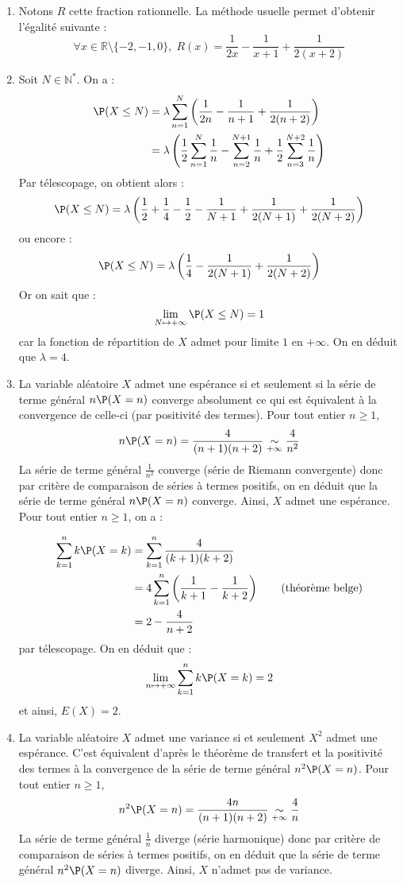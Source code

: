 \documentclass[a4paper,10pt]{report}
\begin{document}
\newpage

\corr \begin{enumerate}
\item Notons $R$ cette fraction rationnelle. La méthode usuelle permet d'obtenir l'égalité suivante :
$$ \forall x \in \mathbb{R} \setminus \lbrace -2,-1,0 \rbrace, \; R(x)= \dfrac{1}{2x}-\dfrac{1}{x+1}+\dfrac{1}{2(x+2)}$$
\item Soit $N\in \mathbb{N}^*$. On a :
\begin{align*}
\P(X\leq N) & =\lambda\displaystyle\sum\limits_{n=1}^{N}\left(\frac{1}{2n}-\frac{1}{n+1}+\frac{1}{2(n+2)}\right) \\
& =\lambda\left(  \dfrac{1}{2}\displaystyle\sum\limits_{n=1}^{N}\dfrac{1}{n}-\displaystyle\sum\limits_{n=2}^{N+1}\dfrac{1}{n}+\frac{1}{2}\displaystyle\sum\limits_{n=3}^{N+2}\dfrac{1}{n}\right) 
\end{align*}
Par télescopage, on obtient alors :
$$\P(X\leq N)=\lambda\left( \dfrac{1}{2}+\dfrac{1}{4}-\dfrac{1}{2}-\dfrac{1}{N+1}+\dfrac{1}{2(N+1)}+\dfrac{1}{2(N+2)}\right) $$ 
ou encore :
$$ \P(X\leq N)=\lambda\left( \dfrac{1}{4}-\dfrac{1}{2(N+1)}+\dfrac{1}{2(N+2)}\right) $$
Or on sait que :
$$\lim\limits_{N\mapsto+\infty} \P(X\leq N)=1$$
car la fonction de répartition de $X$ admet pour limite $1$ en $+ \infty$. On en déduit que $\lambda=4$.
\item La variable aléatoire $X$ admet une espérance si et seulement si la série de terme général $n \P(X=n)$ converge absolument ce qui est équivalent à la convergence de celle-ci (par positivité des termes). Pour tout entier $n \geq 1$,
$$ n \P(X=n) = \frac{4}{(n+1)(n+2)} \underset{+ \infty}{\sim} \dfrac{4}{n^2}$$
La série de terme général $\tfrac{1}{n^2}$ converge (série de Riemann convergente) donc par critère de comparaison de séries à termes positifs, on en déduit que la série de terme général $n \P(X=n)$ converge. Ainsi, $X$ admet une espérance. Pour tout entier $n \geq 1$, on a :

\begin{align*}
\displaystyle\sum\limits_{k=1}^{n}k \P(X=k) & =\displaystyle\sum\limits_{k=1}^{n}\dfrac{4}{(k+1)(k+2)} \\
& =4\displaystyle\sum\limits_{k=1}^{n}\left(\dfrac{1}{k+1}-\dfrac{1}{k+2} \right) \qquad \hbox{(théorème belge)}\\
&   =2-\dfrac{4}{n+2}
\end{align*}
par télescopage. On en déduit que :
$$\lim\limits_{n\mapsto+\infty}\displaystyle\sum\limits_{k=1}^{n}k \P(X=k)=2$$
et ainsi, $E(X)=2$.
\item La variable aléatoire $X$ admet une variance si et seulement $X^2$ admet une espérance. C'est équivalent d'après le théorème de transfert et la positivité des termes à la convergence de la série de terme général $n^2 \P(X=n)$. Pour tout entier $n \geq 1$,
$$ n^2 \P(X=n) = \frac{4n}{(n+1)(n+2)} \underset{+ \infty}{\sim} \dfrac{4}{n}$$
La série de terme général $\tfrac{1}{n}$ diverge (série harmonique) donc par critère de comparaison de séries à termes positifs, on en déduit que la série de terme général $n^2 \P(X=n)$ diverge. Ainsi, $X$ n'admet pas de variance.
\end{enumerate}
\end{document}
